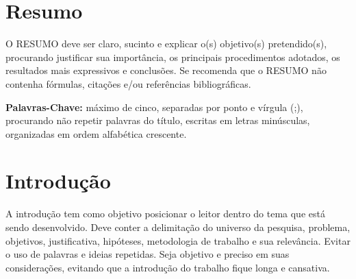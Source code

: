 \documentclass[a0,portrait]{a0poster}
\begin{document}
\begin{multicols}{2} %

\justify %



\section*{Resumo}
\vspace{-1cm}
O RESUMO deve ser claro, sucinto e explicar o(s) objetivo(s) pretendido(s), procurando justificar sua import\^ancia, os principais procedimentos adotados, os resultados mais expressivos e conclus\~oes. Se recomenda que o RESUMO n\~ao contenha f\'ormulas, cita\c c\~oes e/ou refer\^encias bibliogr\'aficas.

\vspace{1cm}

\hspace{-0,5cm}\textbf{Palavras-Chave:} m\'aximo de cinco, separadas por ponto e v\'i­rgula (;), procurando n\~ao repetir palavras do t\'i­tulo, escritas em letras min\'usculas, organizadas em ordem alfab\'etica crescente. 


\section*{Introdu\c c\~ao}
\vspace{-1cm}
A introdu\c c\~ao tem como objetivo posicionar o leitor dentro do tema que est\'a sendo desenvolvido. Deve conter a delimita\c c\~ao do universo da pesquisa, problema, objetivos, justificativa, hip\'oteses, metodologia de trabalho e sua relev\^ancia. Evitar o uso de palavras e ideias repetidas. Seja objetivo e preciso em suas considera\c c\~oes, evitando que a introdu\c c\~ao do trabalho fique longa e cansativa. 


\end{multicols}
\end{document}
